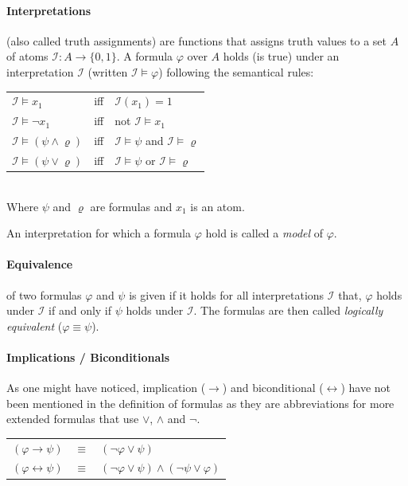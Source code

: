 \paragraph{Interpretations} (also called truth assignments) are functions that assigns truth values to a set $A$ of atoms $\mathcal{I}: A \rightarrow \{0,1\}$. A formula $\varphi$ over $A$ holds (is true) under an interpretation $\mathcal{I}$ (written $\mathcal{I} \models \varphi$) following the semantical rules:
\begin{center}
    \begin{tabular}{ l l l }
    $\mathcal{I} \models x_1$ & iff & $\mathcal{I}(x_1) = 1$\\
    $\mathcal{I} \models \neg x_1$ & iff & not $\mathcal{I} \models x_1$\\
    $\mathcal{I} \models (\psi \land \varrho)$ & iff & $\mathcal{I} \models \psi$ and $\mathcal{I} \models \varrho$\\
    $\mathcal{I} \models (\psi \lor \varrho)$ & iff & $\mathcal{I} \models \psi$ or $\mathcal{I} \models \varrho$\\
\end{tabular}\\
Where $\psi$ and  $\varrho$ are formulas and $x_1$ is an atom.
\end{center}

An interpretation for which a formula $\varphi$ hold is called a \emph{model} of $\varphi$.

\paragraph{Equivalence}
of two formulas $\varphi$ and $\psi$ is given if it holds for all interpretations $\mathcal{I}$ that, $\varphi$ holds under $\mathcal{I}$ if and only if $\psi$ holds under $\mathcal{I}$. The formulas are then called \emph {logically equivalent} ($\varphi \equiv \psi$).

\paragraph{Implications / Biconditionals}
As one might have noticed, implication ($\rightarrow$) and biconditional ($\leftrightarrow$) have not been mentioned in the definition of formulas as they are abbreviations for more extended formulas that use $\lor$, $\land$ and $\neg$.
\begin{center}
\begin{tabular}{ l l l }
    $(\varphi \rightarrow \psi)$ & $\equiv$ & $(\neg\varphi \lor \psi)$\\
    $(\varphi \leftrightarrow \psi)$ & $\equiv$ & $(\neg\varphi \lor \psi) \land (\neg\psi \lor \varphi)$\\
\end{tabular}
\end{center}

